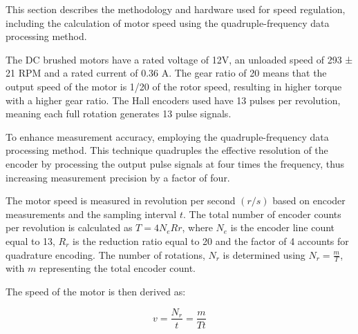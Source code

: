 \documentclass[journal,onecolumn]{IEEEtran}
\begin{document}
This section describes the methodology and hardware used for speed regulation, including the calculation of motor speed using the quadruple-frequency data processing  method.


The DC brushed motors have a rated voltage of 12V, an unloaded speed of 293 ± 21 RPM and a rated current of 0.36 A. The gear ratio of 20 means that the output speed of the motor is 1/20 of the rotor speed, resulting in higher torque with a higher gear ratio. The Hall encoders used have 13 pulses per revolution, meaning each full rotation generates 13 pulse signals. 

To enhance measurement accuracy, employing the quadruple-frequency data processing method. This technique quadruples the effective resolution of the encoder by processing the output pulse signals at four times the frequency, thus increasing measurement precision by a factor of four.


The motor speed is measured in revolution per second $(r/s)$ based on encoder measurements and the sampling interval $t$. The total number of encoder counts per revolution is calculated as $ T=4N_{e}R{r} $, where $N_e$ is the encoder line count equal to 13, $R_r$ is the reduction ratio equal to 20 and the factor of 4 accounts for quadrature encoding. The number of rotations, $N_r$ is determined using $N_r = \frac{m}{T}$, with $m$ representing the total encoder count.

The speed of the motor is then derived as:

\begin{equation}
           \label{motor_speed}
           v = \frac{N_r}{t} = \frac{m}{T  t}
\end{equation}





\end{document}
